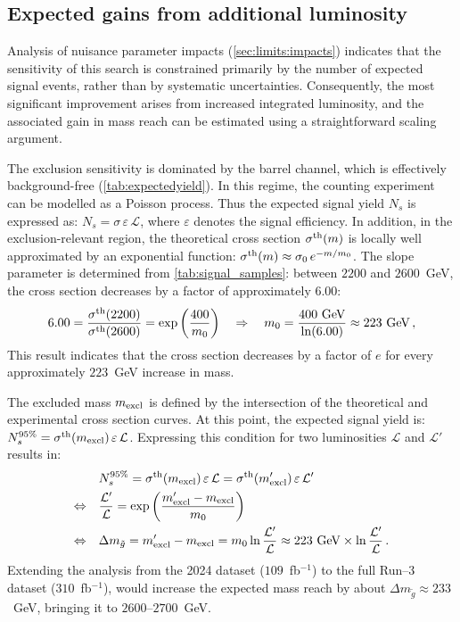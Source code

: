 \subsection{Expected gains from additional luminosity}

Analysis of nuisance parameter impacts (\cref{sec:limits:impacts}) indicates that the sensitivity of this search is constrained primarily by the number of expected signal events, rather than by systematic uncertainties. Consequently, the most significant improvement arises from increased integrated luminosity, and the associated gain in mass reach can be estimated using a straightforward scaling argument.

\vspace{0.5 cm}

The exclusion sensitivity is dominated by the barrel channel, which is effectively background-free (\cref{tab:expectedyield}). In this regime, the counting experiment can be modelled as a Poisson process. Thus the expected signal yield $N_s$ is expressed as: $N_s = \sigma\,\varepsilon\,\mathcal{L}$, where $\varepsilon$ denotes the signal efficiency. In addition, in the exclusion-relevant region, the theoretical cross section $\sigma^{\rm th}(m)$ is locally well approximated by an exponential function: $\sigma^{\rm th}(m) \approx \sigma_0\, e^{-m/m_0}$. The slope parameter is determined from \cref{tab:signal_samples}: between $2200$ and $2600$~GeV, the cross section decreases by a factor of approximately $6.00$:
\begin{equation}
    6.00 = \frac{\sigma^{\rm th}(2200)}{\sigma^{\rm th}(2600)} = \exp\left(\frac{ 400}{m_0} \right) \quad  \Rightarrow \quad m_0 = \frac{400~\textrm{GeV}}{\ln(6.00)} \approx 223~\textrm{GeV} \, ,    
\end{equation}
This result indicates that the cross section decreases by a factor of $e$ for every approximately $223$~GeV increase in mass.

The excluded mass $m_{\rm excl}$ is defined by the intersection of the theoretical and experimental cross section curves. At this point, the expected signal yield is: $N_s^{95\%}=\sigma^{\rm th}(m_{\rm excl})\,\varepsilon\,\mathcal{L}$. Expressing this condition for two luminosities $\mathcal{L}$ and $\mathcal{L}'$ results in:
\begin{equation}
\begin{split}
    &N_s^{95\%}=\sigma^{\rm th}(m_{\rm excl})\,\varepsilon\,\mathcal{L} = \sigma^{\rm th}(m_{\rm excl}')\,\varepsilon\,\mathcal{L}' \\
    \Leftrightarrow \quad & \frac{\mathcal{L}'}{\mathcal{L}} = \exp\left( \frac{m_{\rm excl}'-m_{\rm excl}}{m_0} \right) \\
    \Leftrightarrow \quad & \Delta m_{\tilde{g}} = m_{\rm excl}'-m_{\rm excl} = m_0 \ln\frac{\mathcal{L}'}{\mathcal{L}} \approx 223~\textrm{GeV} \times \ln\frac{\mathcal{L}'}{\mathcal{L}} \, .
    \label{eq:persp:deltam}
\end{split}
\end{equation}
Extending the analysis from the 2024 dataset ($109$~fb$^{-1}$) to the full Run--3 dataset ($310$~fb$^{-1}$), would increase the expected mass reach by about $\Delta m_{\tilde{g}}\approx233$~GeV, bringing it to $2600$--$2700$~GeV.

